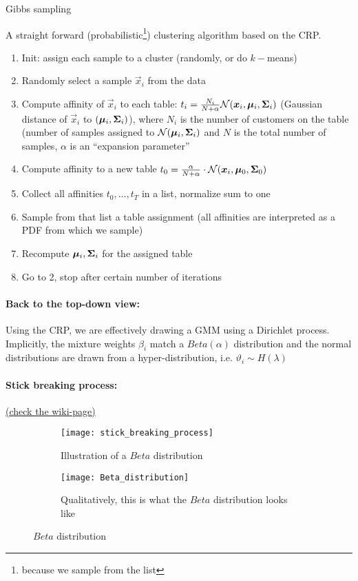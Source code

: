 \begin{algorithm}[H]
\caption{Gibbs sampling}
A straight forward (probabilistic\footnote{because we sample from the list}) clustering algorithm based on the CRP.
\begin{enumerate}
    \item Init: assign each sample to a cluster (\eg randomly, or do \(k-\)means)
    \item Randomly select a sample \(\vec{x}_i\) from the data
    \item Compute affinity of \(\vec{x}_i\) to each table: \(t_i = \frac{N_i}{N+\alpha} \mathcal{N}(\bm{x}_i, \bm{\mu}_i, \bm{\Sigma}_i)\) (Gaussian distance of \(\vec{x}_i\) to \(\mathcal(\bm{\mu}_i, \bm{\Sigma}_i)\)), where \(N_i\) is the number of customers on the table (number of samples assigned to \(\mathcal{N}(\bm{\mu}_i, \bm{\Sigma}_i)\) and \(N\) is the total number of samples, \(\alpha\) is an ``expansion parameter''
    \item Compute affinity to a new table \(t_0 = \frac{\alpha}{N + \alpha} \cdot \mathcal{N}(\bm{x}_i, \bm{\mu}_0, \bm{\Sigma}_0)\)
    \item Collect all affinities \(t_0, \dots, t_T\) in a list, normalize sum to one
    \item Sample from that list a table assignment (all affinities are interpreted as a PDF from which we sample)
    \item Recompute \(\bm{\mu}_i, \bm{\Sigma}_i\) for the assigned table
    \item Go to 2, stop after certain number of iterations
\end{enumerate}
\end{algorithm}

\paragraph{Back to the top-down view:}
Using the CRP, we are effectively drawing a GMM using a Dirichlet process. Implicitly, the mixture weights $\beta_i$ match a $Beta(\alpha)$ distribution and the normal distributions are drawn from a hyper-distribution, i.e. $\vartheta_i \sim H(\lambda)$

\paragraph{Stick breaking process:} \href{https://en.wikipedia.org/wiki/Dirichlet_process#The_stick-breaking_process}{(check the wiki-page)}
\begin{figure}[H]
  \centering
  \begin{subfigure}[b]{0.49\textwidth}
    \texttt{[image: stick\_breaking\_process]}
    \caption{Illustration of a $Beta$ distribution}
  \end{subfigure}
  \begin{subfigure}[b]{0.49\textwidth}
    \texttt{[image: Beta\_distribution]}
    \caption{Qualitatively, this is what the $Beta$ distribution looks like}
  \end{subfigure}
  \caption{$Beta$ distribution}
\end{figure}

